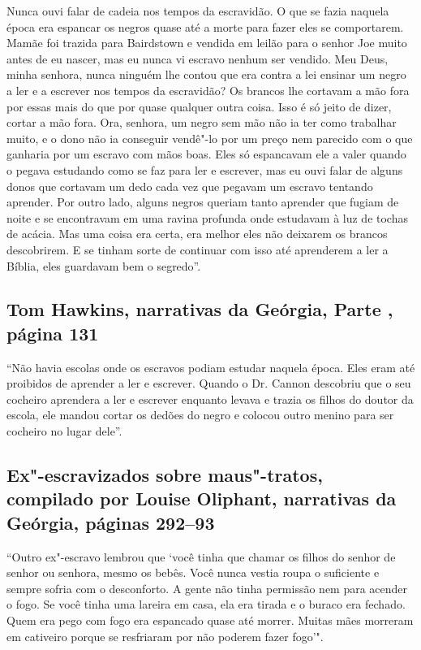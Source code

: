 Nunca ouvi falar de cadeia nos tempos da escravidão. O que se fazia
naquela época era espancar os negros quase até a morte para fazer eles
se comportarem. Mamãe foi trazida para Bairdstown e vendida em leilão
para o senhor Joe muito antes de eu nascer, mas eu nunca vi escravo
nenhum ser vendido. Meu Deus, minha senhora, nunca ninguém lhe contou
que era contra a lei ensinar um negro a ler e a escrever nos tempos da
escravidão? Os brancos lhe cortavam a mão fora por essas mais do que por
quase qualquer outra coisa. Isso é só jeito de dizer, cortar a mão fora.
Ora, senhora, um negro sem mão não ia ter como trabalhar muito, e o dono
não ia conseguir vendê"-lo por um preço nem parecido com o que ganharia
por um escravo com mãos boas. Eles só espancavam ele a valer quando o
pegava estudando como se faz para ler e escrever, mas eu ouvi falar de
alguns donos que cortavam um dedo cada vez que pegavam um escravo
tentando aprender. Por outro lado, alguns negros queriam tanto aprender
que fugiam de noite e se encontravam em uma ravina profunda onde
estudavam à luz de tochas de acácia. Mas uma coisa era certa, era melhor
eles não deixarem os brancos descobrirem. E se tinham sorte de continuar
com isso até aprenderem a ler a Bíblia, eles guardavam bem o segredo''.

\subsection{Tom Hawkins, narrativas da Geórgia, Parte , página 131}
\label{ref126}

``Não havia escolas onde os escravos podiam estudar naquela época. Eles
eram até proibidos de aprender a ler e escrever. Quando o Dr. Cannon
descobriu que o seu cocheiro aprendera a ler e escrever enquanto levava
e trazia os filhos do doutor da escola, ele mandou cortar os dedões do
negro e colocou outro menino para ser cocheiro no lugar dele''.

\subsection{Ex"-escravizados sobre maus"-tratos, compilado por Louise Oliphant, narrativas
da Geórgia, páginas 292--93}

``Outro ex"-escravo lembrou que `você tinha que chamar os filhos do
senhor de senhor ou senhora, mesmo os bebês. Você nunca vestia roupa o
suficiente e sempre sofria com o desconforto. A gente não tinha
permissão nem para acender o fogo. Se você tinha uma lareira em casa,
ela era tirada e o buraco era fechado. Quem era pego com fogo era
espancado quase até morrer. Muitas mães morreram em cativeiro porque se
resfriaram por não poderem fazer fogo'".

